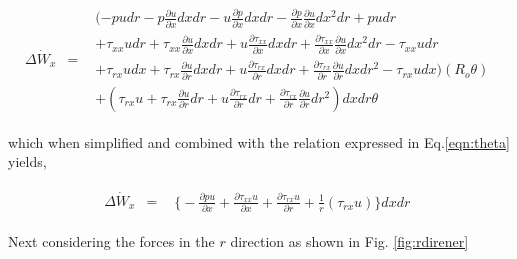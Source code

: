 \begin{displaymath}
	\begin{array}{ccc}
		\Delta \dot{W}_x & = &
			\begin{array}{c} 
		(-p udr - p \frac{\partial u}{\partial x}dxdr - u \frac{\partial p}{\partial x}dxdr - 
		\frac{\partial p}{\partial x} \frac{\partial u}{\partial x}dx^2dr + pudr \\
		+ \tau_{xx}udr + \tau_{xx} \frac{\partial u}{\partial x}dxdr + u \frac{\partial \tau_{xx}}{\partial x}dxdr
		+ \frac{\partial \tau_{xx}}{\partial x} \frac{\partial u}{\partial x} dx^2dr - \tau_{xx}udr \\
		+ \tau_{rx}udx + \tau_{rx} \frac{\partial u}{\partial r}dxdr + u \frac{\partial \tau_{rx}}{\partial r}dxdr
		+ \frac{\partial \tau_{rx}}{\partial r} \frac{\partial u}{\partial r} dxdr^2 - \tau_{rx}udx)	
		(R_o \theta) \\
		+ (\tau_{rx}u + \tau_{rx} \frac{\partial u}{\partial r}dr + u \frac{\partial \tau_{rx}}{\partial r}dr
		+ \frac{\partial \tau_{rx}}{\partial r} \frac{\partial u}{\partial r} dr^2)dxdr \theta
			\end{array}
	\end{array}
\end{displaymath}

	which when simplified and combined with the relation expressed in Eq.\ref{eqn:theta} yields,

\begin{displaymath}
	\begin{array}{ccc}
		\Delta \dot{W}_x & = &
			\begin{array}{c} 
		\Big\{-\frac{\partial pu}{\partial x} + \frac{\partial \tau_{xx}u}{\partial x}
		+ \frac{\partial \tau_{rx}u}{\partial r} + \frac{1}{r}(\tau_{rx}u)\Big\}dxdr 
			\end{array}
	\end{array}
\end{displaymath}

	Next considering the forces in the $r$ direction as shown in Fig. \ref{fig:rdirener}

